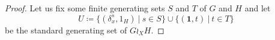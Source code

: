 \documentclass[a4paper]{article}
\theoremstyle{definition}
\theoremstyle{remark}
\DeclareMathOperator\Sch{Sch}
\DeclareMathOperator\stab{Stab}
\DeclarePairedDelimiter\abs{\lvert}{\rvert}
\newcommand{\setst}[2]{\{#1\ |\ #2\}}
\begin{document}
\begin{proof}
Let us fix some finite generating sets $S$ and $T$ of $G$ and $H$ and let
\[
	U\coloneqq\setst{(\delta_x^s,1_H)}{s \in S} \cup \setst{(\mathbf 1,t)}{t \in T}
\]
be the standard generating set of $G\wr_XH$.
%
%
%
%
%

\end{proof}
\end{document}
